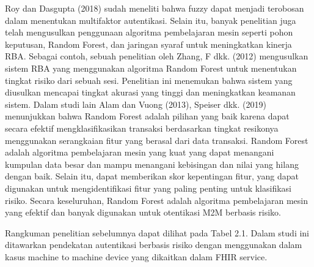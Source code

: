 Roy dan Dasgupta (2018) sudah meneliti bahwa fuzzy dapat menjadi terobosan
dalam menentukan multifaktor autentikasi. Selain itu, banyak penelitian juga telah
mengusulkan penggunaan algoritma pembelajaran mesin seperti pohon keputusan,
Random Forest, dan jaringan syaraf untuk meningkatkan kinerja RBA. Sebagai
contoh, sebuah penelitian oleh Zhang, F dkk. (2012) mengusulkan sistem RBA
yang menggunakan algoritma Random Forest untuk menentukan tingkat risiko dari
sebuah sesi. Penelitian ini menemukan bahwa sistem yang diusulkan mencapai
tingkat akurasi yang tinggi dan meningkatkan keamanan sistem. Dalam studi lain
Alam dan Vuong (2013), Speiser dkk. (2019) menunjukkan bahwa Random Forest
adalah pilihan yang baik karena dapat secara efektif mengklasifikasikan transaksi
berdasarkan tingkat resikonya menggunakan serangkaian fitur yang berasal dari
data transaksi. Random Forest adalah algoritma pembelajaran mesin yang kuat yang
dapat menangani kumpulan data besar dan mampu menangani kebisingan dan nilai
yang hilang dengan baik. Selain itu, dapat memberikan skor kepentingan fitur, yang
dapat digunakan untuk mengidentifikasi fitur yang paling penting untuk klasifikasi
risiko. Secara keseluruhan, Random Forest adalah algoritma pembelajaran mesin
yang efektif dan banyak digunakan untuk otentikasi M2M berbasis risiko.

Rangkuman penelitian sebelumnya dapat dilihat pada Tabel 2.1. Dalam studi
ini ditawarkan pendekatan autentikasi berbasis risiko dengan menggunakan dalam
kasus machine to machine device yang dikaitkan dalam FHIR service.

